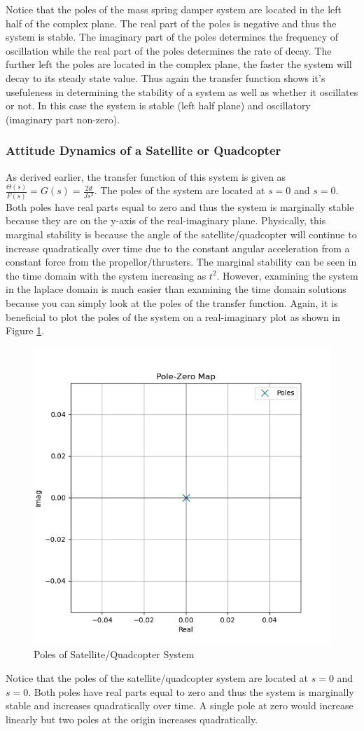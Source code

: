 Notice that the poles of the mass spring damper system are located in the left half of the complex plane. The real part of the poles is negative and thus the system is stable. The imaginary part of the poles determines the frequency of oscillation while the real part of the poles determines the rate of decay. The further left the poles are located in the complex plane, the faster the system will decay to its steady state value. Thus again the transfer function shows it's usefuleness in determining the stability of a system as well as whether it oscillates or not. In this case the system is stable (left half plane) and oscillatory (imaginary part non-zero).

\subsubsection{Attitude Dynamics of a Satellite or Quadcopter}

As derived earlier, the transfer function of this system is given as $\frac{\Theta(s)}{F(s)}= G(s) = \frac{2d}{Js^2}$. The poles of the system are located at $s=0$ and $s=0$. Both poles have real parts equal to zero and thus the system is marginally stable because they are on the y-axis of the real-imaginary plane. Physically, this marginal stability is because the angle of the satellite/quadcopter will continue to increase quadratically over time due to the constant angular acceleration from a constant force from the propellor/thrusters. The marginal stability can be seen in the time domain with the system increasing as $t^2$. However, examining the system in the laplace domain is much easier than examining the time domain solutions because you can simply look at the poles of the transfer function. Again, it is beneficial to plot the poles of the system on a real-imaginary plot as shown in Figure \ref{f:satellite_poles}.
\begin{figure}[H]
\centering
\includegraphics[width=0.48\linewidth]{Figures/satellite_poles.png}
\caption{Poles of Satellite/Quadcopter System}
\label{f:satellite_poles}
\end{figure}
Notice that the poles of the satellite/quadcopter system are located at $s=0$ and $s=0$. Both poles have real parts equal to zero and thus the system is marginally stable and increases quadratically over time. A single pole at zero would increase linearly but two poles at the origin increases quadratically.

